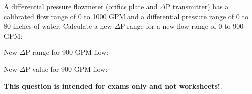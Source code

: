 

A differential pressure flowmeter (orifice plate and $\Delta$P transmitter) has a calibrated flow range of 0 to 1000 GPM and a differential pressure range of 0 to 80 inches of water.  Calculate a new $\Delta$P range for a new flow range of 0 to 900 GPM:

\vskip 10pt

New $\Delta$P range for 900 GPM flow: \underbar{\hskip 50pt}







New $\Delta$P value for 900 GPM flow: 







{\bf This question is intended for exams only and not worksheets!}.




